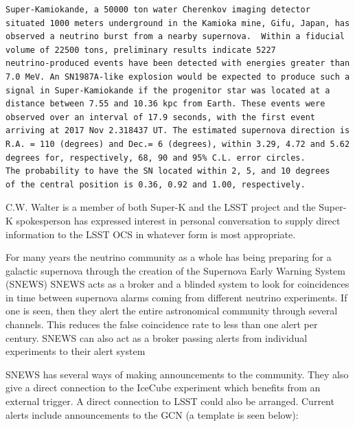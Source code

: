 \documentclass[12pt, letterpaper]{article}
\newcommand{\superk}  {Super\nobreakdash-K\xspace}
\begin{document}
\begin{verbatim}
Super-Kamiokande, a 50000 ton water Cherenkov imaging detector
situated 1000 meters underground in the Kamioka mine, Gifu, Japan, has
observed a neutrino burst from a nearby supernova.  Within a fiducial
volume of 22500 tons, preliminary results indicate 5227
neutrino-produced events have been detected with energies greater than
7.0 MeV. An SN1987A-like explosion would be expected to produce such a
signal in Super-Kamiokande if the progenitor star was located at a
distance between 7.55 and 10.36 kpc from Earth. These events were
observed over an interval of 17.9 seconds, with the first event
arriving at 2017 Nov 2.318437 UT. The estimated supernova direction is
R.A. = 110 (degrees) and Dec.= 6 (degrees), within 3.29, 4.72 and 5.62
degrees for, respectively, 68, 90 and 95% C.L. error circles. 
The probability to have the SN located within 2, 5, and 10 degrees 
of the central position is 0.36, 0.92 and 1.00, respectively.
\end{verbatim}

C.W. Walter is a member of both \superk and the LSST project and
the \superk spokesperson has expressed interest in personal
conversation to supply direct information to the LSST OCS in whatever
form is most appropriate.

For many years the neutrino community as a whole has being preparing
for a galactic supernova through the creation of the Supernova Early
Warning System (SNEWS) SNEWS acts as a
broker and a blinded system to look for coincidences in time between
supernova alarms coming from different neutrino experiments. If one is
seen, then they alert the entire astronomical community through several
channels. This reduces the false coincidence rate to less than one
alert per century. SNEWS can also act as a broker passing alerts from
individual experiments to their alert system

SNEWS has several ways of making announcements to the community.  They
also give a direct connection to the IceCube experiment which benefits
from an external trigger.  A direct connection to LSST could also be
arranged.  Current  alerts include announcements to the GCN (a
template is seen below):
\end{document}
